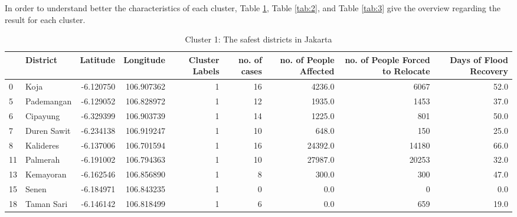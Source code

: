 \noindent
In order to understand better the characteristics of each cluster, Table \ref{tab:1}, Table \ref{tab:2}, and Table \ref{tab:3} give the overview regarding the result for each cluster.\\
\begin{table}
\centering
\caption{Cluster 1: The safest districts in Jakarta}
\label{tab:1}
\begin{adjustbox}{width=\textwidth}
\begin{tabular}{llrrrrrrr}
\toprule
{} &       District &  Latitude &   Longitude &  Cluster Labels &  no. of cases &  no. of People Affected &  no. of People Forced to Relocate &  Days of Flood Recovery \\
\midrule
0  &           Koja & -6.120750 &  106.907362 &               1 &            16 &                  4236.0 &                              6067 &                    52.0 \\
5  &     Pademangan & -6.129052 &  106.828972 &               1 &            12 &                  1935.0 &                              1453 &                    37.0 \\
6  &       Cipayung & -6.329399 &  106.903739 &               1 &            14 &                  1225.0 &                               801 &                    50.0 \\
7  &    Duren Sawit & -6.234138 &  106.919247 &               1 &            10 &                   648.0 &                               150 &                    25.0 \\
8  &      Kalideres & -6.137006 &  106.701594 &               1 &            16 &                 24392.0 &                             14180 &                    66.0 \\
11 &       Palmerah & -6.191002 &  106.794363 &               1 &            10 &                 27987.0 &                             20253 &                    32.0 \\
13 &      Kemayoran & -6.162546 &  106.856890 &               1 &             8 &                   300.0 &                               300 &                    47.0 \\
15 &          Senen & -6.184971 &  106.843235 &               1 &             0 &                     0.0 &                                 0 &                     0.0 \\
18 &     Taman Sari & -6.146142 &  106.818499 &               1 &             6 &                     0.0 &                               659 &                    19.0 \\

\end{tabular}
\end{adjustbox}
\end{table}
